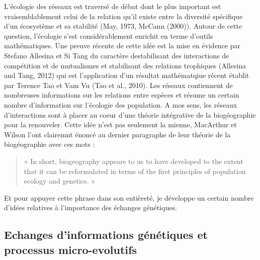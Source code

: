 L'écologie des réseaux est traversé de débat dont le plus important est
vraisemblablement celui de la relation qu'il existe entre la diversité
spécifique d'un écosystème et sa stabilité (May, 1973, McCann (2000)).
Autour de cette question, l'écologie s'est considérablement enrichit en
terme d'outils mathématiques. Une preuve récente de cette idée est la
mise en évidence par Stefano Allesina et Si Tang du caractère
destabilisant des interactions de compétition et de mutualismes et
stabilisant des relations trophiques (Allesina and Tang, 2012) qui est
l'application d'un résultat mathématqiue récent établit par Terence Tao
et Vam Vu (Tao et al., 2010). Les réseaux contiennent de nombreuses
informations sur les relations entre espèces et résume un certain nombre
d'information sur l'écologie des population. A mos sens, les réseaux
d'interactions sont à placer au coeur d'une théorie intégrative de la
biogéographie pour la renouveler. Cette idée n'est pas seulement la
mienne, MacArthur et Wilson l'ont clairemnt énoncé au dernier paragraphe
de leur théorie de la biogéographie avec ces mots :

\begin{quote}
« In short, biogeography appears to us to have developed to the extent
that it can be reformulated in terms of the first principles of
population ecology and genetics. »
\end{quote}

Et pour appuyer cette phrase dans son entièreté, je développe un certain
nombre d'idées relatives à l'importance des échanges génétiques.

\subsection*{Echanges d'informations génétiques et processus
micro-evolutifs}\label{echanges-dinformations-guxe9nuxe9tiques-et-processus-micro-evolutifs}


